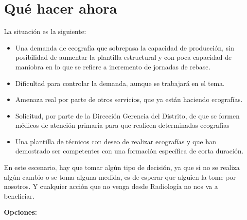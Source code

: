 \documentclass[]{article}
\providecommand{\tightlist}{%
  \setlength{\itemsep}{0pt}\setlength{\parskip}{0pt}}
\begin{document}
\hypertarget{que-hacer-ahora}{%
\section{Qué hacer ahora}\label{que-hacer-ahora}}

La situación es la siguiente:

\begin{itemize}
\tightlist
\item
  Una demanda de ecografía que sobrepasa la capacidad de producción, sin posibilidad de aumentar la plantilla estructural y con poca capacidad de maniobra en lo que se refiere a incremento de jornadas de rebase.
\item
  Dificultad para controlar la demanda, aunque se trabajará en el tema.
\item
  Amenaza real por parte de otros servicios, que ya están haciendo ecografías.
\item
  Solicitud, por parte de la Dirección Gerencia del Distrito, de que se formen médicos de atención primaria para que realicen determinadas ecografías
\item
  Una plantilla de técnicos con deseo de realizar ecografías y que han demostrado ser competentes con una formación específica de corta duración.
\end{itemize}

En este escenario, hay que tomar algún tipo de decisión, ya que si no se realiza algún cambio o se toma alguna medida, es de esperar que alguien la tome por nosotros. Y cualquier acción que no venga desde Radiología no nos va a beneficiar.

\textbf{Opciones:}
\end{document}
